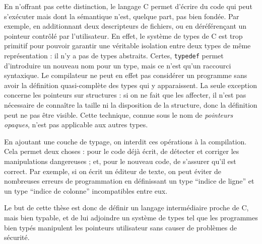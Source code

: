 En n'offrant pas cette distinction, le langage C permet d'écrire du code qui
peut s'exécuter mais dont la sémantique n'est, quelque part, pas bien fondée.
Par exemple, en additionnant deux descripteurs de fichiers, ou en déréférençant
un pointeur contrôlé par l'utilisateur. En effet, le système de types de C est
trop primitif pour pouvoir garantir une véritable isolation entre deux types de
même représentation : il n'y a pas de types abstraits. Certes, \texttt{typedef}
permet d'introduire un nouveau nom pour un type, mais ce n'est qu'un raccourci
syntaxique. Le compilateur ne peut en effet pas considérer un programme sans
avoir la définition quasi-complète des types qui y apparaissent. La seule
exception concerne les pointeurs sur structures : si on ne fait que les
affecter, il n'est pas nécessaire de connaître la taille ni la disposition de la
structure, donc la définition peut ne pas être visible. Cette technique, connue
sous le nom de \emph{pointeurs opaques}, n'est pas applicable aux autres types.

En ajoutant une couche de typage, on interdit ces opérations à la compilation.
Cela permet deux choses : pour le code déjà écrit, de détecter et corriger les
manipulations dangereuses ; et, pour le nouveau code, de s'assurer qu'il est
correct. Par exemple, si on écrit un éditeur de texte, on peut éviter de
nombreuses erreurs de programmation en définissant un type \enquote{indice de
ligne} et un type \enquote{indice de colonne} incompatibles entre eux.

Le but de cette thèse est donc de définir un langage intermédiaire proche de C,
mais bien typable, et de lui adjoindre un système de types tel que les
programmes bien typés manipulent les pointeurs utilisateur sans causer de
problèmes de sécurité.


